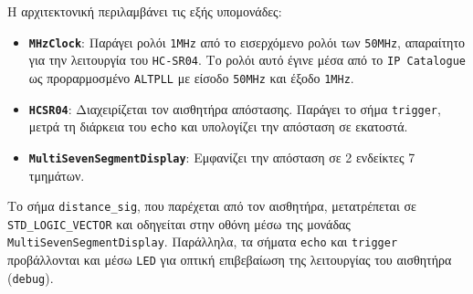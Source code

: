 \documentclass[conference]{IEEEtran}
\begin{document}
Η αρχιτεκτονική περιλαμβάνει τις εξής υπομονάδες:

\begin{itemize}
    \item \textbf{\texttt{MHzClock}}: Παράγει ρολόι \texttt{1MHz} από το εισερχόμενο ρολόι των \texttt{50MHz}, απαραίτητο για την λειτουργία του \texttt{HC-SR04}. Το ρολόι αυτό έγινε μέσα από το \texttt{IP Catalogue} ως προραρμοσμένο \texttt{ALTPLL}\cite{altpll} με είσοδο \texttt{50MHz} και έξοδο \texttt{1MHz}.
    
    \item \textbf{\texttt{HCSR04}}: Διαχειρίζεται τον αισθητήρα απόστασης. Παράγει το σήμα \texttt{trigger}, μετρά τη διάρκεια του \texttt{echo} και υπολογίζει την απόσταση σε εκατοστά.

    \item \textbf{\texttt{MultiSevenSegmentDisplay}}: Εμφανίζει την απόσταση σε 2 ενδείκτες 7 τμημάτων.
\end{itemize}

Το σήμα \texttt{distance\_sig}, που παρέχεται από τον αισθητήρα, μετατρέπεται σε \texttt{STD\_LOGIC\_VECTOR} και οδηγείται στην οθόνη μέσω της μονάδας \texttt{MultiSevenSegmentDisplay}. Παράλληλα, τα σήματα \texttt{echo} και \texttt{trigger} προβάλλονται και μέσω \texttt{LED} για οπτική επιβεβαίωση της λειτουργίας του αισθητήρα (\texttt{debug}).
\end{document}
